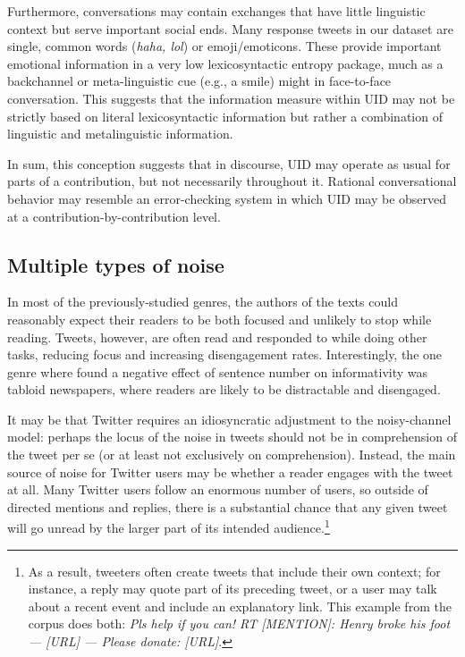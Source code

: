 \documentclass[11pt,letterpaper]{article}
\begin{document}
Furthermore, conversations may contain exchanges that have little linguistic context but serve important social ends.  Many response tweets in our dataset are single, common words ({\it haha, lol}) or emoji/emoticons.  These provide important emotional information in a very low lexicosyntactic entropy package, much as a backchannel or meta-linguistic cue (e.g., a smile) might in face-to-face conversation.  This suggests that the information measure within UID may not be strictly based on literal lexicosyntactic information but rather a combination of linguistic and metalinguistic information.

In sum, this conception suggests that in discourse, UID may operate as usual for parts of a contribution, but not necessarily throughout it.  Rational conversational behavior may resemble an error-checking system in which UID may be observed at a contribution-by-contribution level.

\subsection{Multiple types of noise}

In most of the previously-studied genres, the authors of the texts could reasonably expect their readers to be both focused and unlikely to stop while reading. Tweets, however, are often read and responded to while doing other tasks, reducing focus and increasing disengagement rates.  Interestingly, the one genre where  found a negative effect of sentence number on informativity was tabloid newspapers, where readers are likely to be distractable and disengaged.

It may be that Twitter requires an idiosyncratic adjustment to the noisy-channel model: perhaps the locus of the noise in tweets should not be in comprehension of the tweet per se (or at least not exclusively on comprehension). Instead, the main source of noise for Twitter users may be whether a reader engages with the tweet at all. Many Twitter users follow an enormous number of users, so outside of directed mentions and replies, there is a substantial chance that any given tweet will go unread by the larger part of its intended audience.\footnote{As a result, tweeters often create tweets that include their own context; for instance, a reply may quote part of its preceding tweet, or a user may talk about a recent event and include an explanatory link. This example from the corpus does both: {\it Pls help if you can! RT [MENTION]: Henry broke his foot — [URL] — Please donate: [URL]}.}
\end{document}
